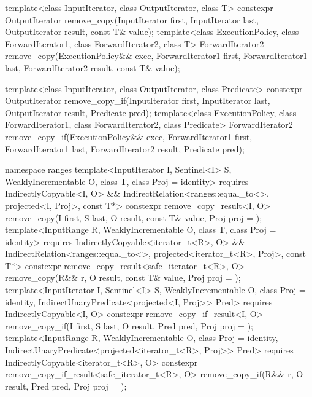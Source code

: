 %
%
\begin{itemdecl}
template<class InputIterator, class OutputIterator, class T>
  constexpr OutputIterator
    remove_copy(InputIterator first, InputIterator last,
                OutputIterator result, const T& value);
template<class ExecutionPolicy, class ForwardIterator1, class ForwardIterator2,
         class T>
  ForwardIterator2
    remove_copy(ExecutionPolicy&& exec,
                ForwardIterator1 first, ForwardIterator1 last,
                ForwardIterator2 result, const T& value);

template<class InputIterator, class OutputIterator, class Predicate>
  constexpr OutputIterator
    remove_copy_if(InputIterator first, InputIterator last,
                   OutputIterator result, Predicate pred);
template<class ExecutionPolicy, class ForwardIterator1, class ForwardIterator2,
         class Predicate>
  ForwardIterator2
    remove_copy_if(ExecutionPolicy&& exec,
                   ForwardIterator1 first, ForwardIterator1 last,
                   ForwardIterator2 result, Predicate pred);

namespace ranges {
  template<InputIterator I, Sentinel<I> S, WeaklyIncrementable O, class T,
           class Proj = identity>
    requires IndirectlyCopyable<I, O> &&
             IndirectRelation<ranges::equal_to<>, projected<I, Proj>, const T*>
    constexpr remove_copy_result<I, O>
      remove_copy(I first, S last, O result, const T& value, Proj proj = {});
  template<InputRange R, WeaklyIncrementable O, class T, class Proj = identity>
    requires IndirectlyCopyable<iterator_t<R>, O> &&
             IndirectRelation<ranges::equal_to<>, projected<iterator_t<R>, Proj>, const T*>
    constexpr remove_copy_result<safe_iterator_t<R>, O>
      remove_copy(R&& r, O result, const T& value, Proj proj = {});
  template<InputIterator I, Sentinel<I> S, WeaklyIncrementable O,
           class Proj = identity, IndirectUnaryPredicate<projected<I, Proj>> Pred>
    requires IndirectlyCopyable<I, O>
    constexpr remove_copy_if_result<I, O>
      remove_copy_if(I first, S last, O result, Pred pred, Proj proj = {});
  template<InputRange R, WeaklyIncrementable O, class Proj = identity,
           IndirectUnaryPredicate<projected<iterator_t<R>, Proj>> Pred>
    requires IndirectlyCopyable<iterator_t<R>, O>
    constexpr remove_copy_if_result<safe_iterator_t<R>, O>
      remove_copy_if(R&& r, O result, Pred pred, Proj proj = {});
}
\end{itemdecl}

